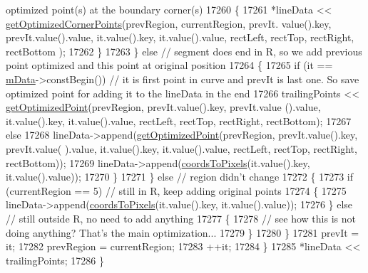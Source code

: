 \begin{DoxyCode}
{       optimized point(s) at the boundary corner(s)}
17260         \{
17261           *lineData << \hyperlink{class_q_c_p_curve_aad0b69d9a7a2a5367fcc9fe3edaf9bf4}{getOptimizedCornerPoints}(prevRegion, currentRegion, prevIt.
      value().key, prevIt.value().value, it.value().key, it.value().value, rectLeft, rectTop, rectRight, rectBottom
      );
17262         \}
17263       \} \textcolor{keywordflow}{else} \textcolor{comment}{// segment does end in R, so we add previous point optimized and this point at original
       position}
17264       \{
17265         \textcolor{keywordflow}{if} (it == \hyperlink{class_q_c_p_curve_a88d533e455bca96004b049e99168731b}{mData}->constBegin()) \textcolor{comment}{// it is first point in curve and prevIt is last one. So save
       optimized point for adding it to the lineData in the end}
17266           trailingPoints << \hyperlink{class_q_c_p_curve_acbcfea8986dde6c0143e3f7e8e76041d}{getOptimizedPoint}(prevRegion, prevIt.value().key, prevIt.value
      ().value, it.value().key, it.value().value, rectLeft, rectTop, rectRight, rectBottom);
17267         \textcolor{keywordflow}{else}
17268           lineData->append(\hyperlink{class_q_c_p_curve_acbcfea8986dde6c0143e3f7e8e76041d}{getOptimizedPoint}(prevRegion, prevIt.value().key, prevIt.value(
      ).value, it.value().key, it.value().value, rectLeft, rectTop, rectRight, rectBottom));
17269         lineData->append(\hyperlink{class_q_c_p_abstract_plottable_ade710a776104b14c1c835168ce1bfc5c}{coordsToPixels}(it.value().key, it.value().value));
17270       \}
17271     \} \textcolor{keywordflow}{else} \textcolor{comment}{// region didn't change}
17272     \{
17273       \textcolor{keywordflow}{if} (currentRegion == 5) \textcolor{comment}{// still in R, keep adding original points}
17274       \{
17275         lineData->append(\hyperlink{class_q_c_p_abstract_plottable_ade710a776104b14c1c835168ce1bfc5c}{coordsToPixels}(it.value().key, it.value().value));
17276       \} \textcolor{keywordflow}{else} \textcolor{comment}{// still outside R, no need to add anything}
17277       \{
17278         \textcolor{comment}{// see how this is not doing anything? That's the main optimization...}
17279       \}
17280     \}
17281     prevIt = it;
17282     prevRegion = currentRegion;
17283     ++it;
17284   \}
17285   *lineData << trailingPoints;
17286 \}
\end{DoxyCode}


